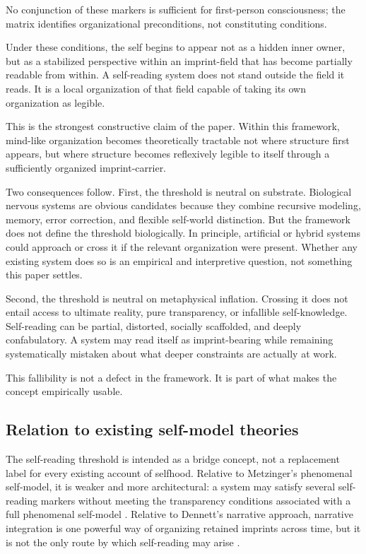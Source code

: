 \documentclass[12pt]{article}
\begin{document}
No conjunction of these markers is sufficient for first-person consciousness; the matrix identifies organizational preconditions, not constituting conditions.

Under these conditions, the self begins to appear not as a hidden inner owner, but as a stabilized perspective within an imprint-field that has become partially readable from within. A self-reading system does not stand outside the field it reads. It is a local organization of that field capable of taking its own organization as legible.

This is the strongest constructive claim of the paper. Within this framework, mind-like organization becomes theoretically tractable not where structure first appears, but where structure becomes reflexively legible to itself through a sufficiently organized imprint-carrier.

Two consequences follow. First, the threshold is neutral on substrate. Biological nervous systems are obvious candidates because they combine recursive modeling, memory, error correction, and flexible self-world distinction. But the framework does not define the threshold biologically. In principle, artificial or hybrid systems could approach or cross it if the relevant organization were present. Whether any existing system does so is an empirical and interpretive question, not something this paper settles.

Second, the threshold is neutral on metaphysical inflation. Crossing it does not entail access to ultimate reality, pure transparency, or infallible self-knowledge. Self-reading can be partial, distorted, socially scaffolded, and deeply confabulatory. A system may read itself as imprint-bearing while remaining systematically mistaken about what deeper constraints are actually at work.

This fallibility is not a defect in the framework. It is part of what makes the concept empirically usable.

\subsection{Relation to existing self-model theories}

The self-reading threshold is intended as a bridge concept, not a replacement label for every existing account of selfhood. Relative to Metzinger's phenomenal self-model, it is weaker and more architectural: a system may satisfy several self-reading markers without meeting the transparency conditions associated with a full phenomenal self-model \cite{Metzinger2003}. Relative to Dennett's narrative approach, narrative integration is one powerful way of organizing retained imprints across time, but it is not the only route by which self-reading may arise \cite{Dennett1992}.
\end{document}
